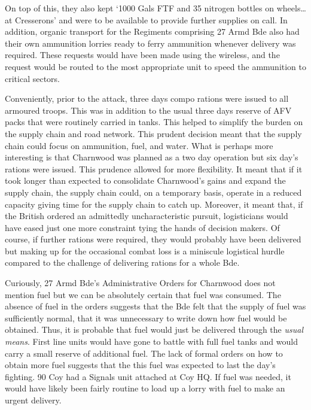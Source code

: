 \documentclass[noraggedright]{turabian-researchpaper}
\newcommand{\CharnAdm}{27 Armd Bde Adm Order No. 7, 7 July 1944}
\begin{document}
On top of this, they also kept `1000 Gals FTF %
and 35 nitrogen bottles on wheels\ldots at Cresserons' and were to be
available to provide further supplies on call.\autocite[\CharnAdm][Para 6]
{27wd} In addition, organic transport for the Regiments comprising 27 Armd 
Bde also had their own ammunition lorries ready to ferry ammunition whenever 
delivery was required.  These requests would have been made using the 
wireless, and the request would be routed to the most appropriate unit to 
speed the ammunition to critical sectors.\autocite[13th/18th Royal Hussars 
Operation Order No. 1, Operation Charnwood (See July appendix)][Para 9b]
{1318wd} 

Conveniently, prior to the attack, three days compo rations were issued to 
all armoured troops.  This was in addition to the usual three days reserve of 
AFV packs that were routinely carried in tanks.\autocite[\CharnAdm][Para 7]
{27wd}  This helped to simplify the burden on the supply chain and road 
network.  This prudent 
decision meant that the supply chain could focus on ammunition, fuel, and 
water.  What is perhaps more interesting is that Charnwood was planned as a 
two day operation but six day's rations were issued.  This prudence allowed 
for more flexibility.  It meant that if it took longer than expected to 
consolidate Charnwood's gains and expand the supply chain, the supply chain 
could, on a temporary basis, operate in a reduced capacity giving time for 
the supply chain to catch up.  Moreover, it meant that, if the British 
ordered an admittedly uncharacteristic pursuit, logisticians would have eased 
just one more constraint tying the hands of decision makers.  Of course, if 
further rations were required, they would probably have been delivered but 
making up for the occasional combat loss is a miniscule logistical hurdle
compared to the challenge of delivering rations for a whole Bde.

Curiously, 27 Armd Bde's Administrative Orders for Charnwood does not 
mention fuel but we can be absolutely certain that fuel was consumed.  The 
absence 
of fuel in the orders suggests that the Bde felt that the supply of fuel was 
sufficiently normal, that it was unnecessary to write down how fuel would be 
obtained.  Thus, it is probable that fuel would just be delivered through the 
\textit{usual means}.  First line units would have gone to battle with full 
fuel tanks and would carry a small reserve of additional fuel. The lack of 
formal orders on how to obtain more fuel suggests that the this fuel was 
expected to last the day's fighting.   90 Coy had a Signals unit attached at 
Coy HQ.  If fuel was needed, it would have likely been fairly routine to load 
up a lorry with fuel to make an urgent delivery.  
\end{document}
